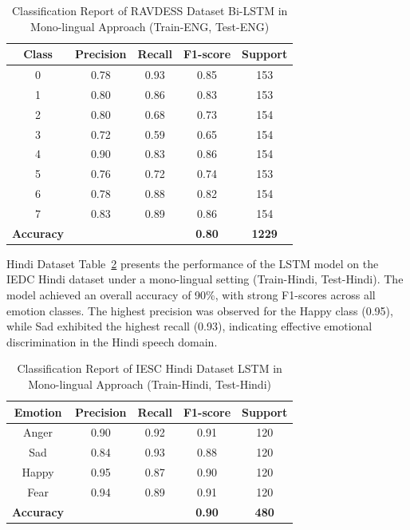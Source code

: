 \documentclass[runningheads]{llncs}
\begin{document}
\begin{table}[!htbp]
\caption{Classification Report of RAVDESS Dataset Bi-LSTM in Mono-lingual Approach (Train-ENG, Test-ENG)}
\centering
\begin{tabular}{ccccc}
\toprule
\textbf{Class} & \textbf{Precision} & \textbf{Recall} & \textbf{F1-score} & \textbf{Support} \\
\midrule
0 & 0.78 & 0.93 & 0.85 & 153 \\
1 & 0.80 & 0.86 & 0.83 & 153 \\
2 & 0.80 & 0.68 & 0.73 & 154 \\
3 & 0.72 & 0.59 & 0.65 & 154 \\
4 & 0.90 & 0.83 & 0.86 & 154 \\
5 & 0.76 & 0.72 & 0.74 & 153 \\
6 & 0.78 & 0.88 & 0.82 & 154 \\
7 & 0.83 & 0.89 & 0.86 & 154 \\
\midrule
\textbf{Accuracy} &  &  & \textbf{0.80} & \textbf{1229} \\
\bottomrule
\end{tabular}
\label{tab:ravdess_bilstm_mono_eng}
\end{table}

Hindi Dataset Table~\ref{tab:iedc_hindi_lstm_mono} presents the performance of the LSTM model on the IEDC Hindi dataset under a mono-lingual setting (Train-Hindi, Test-Hindi). The model achieved an overall accuracy of 90\%, with strong F1-scores across all emotion classes. The highest precision was observed for the Happy class (0.95), while Sad exhibited the highest recall (0.93), indicating effective emotional discrimination in the Hindi speech domain.

\begin{table}[!htbp]
\caption{Classification Report of IESC Hindi Dataset LSTM in Mono-lingual Approach (Train-Hindi, Test-Hindi)}
\centering
\begin{tabular}{ccccc}
\toprule
\textbf{Emotion} & \textbf{Precision} & \textbf{Recall} & \textbf{F1-score} & \textbf{Support} \\
\midrule
Anger & 0.90 & 0.92 & 0.91 & 120 \\
Sad & 0.84 & 0.93 & 0.88 & 120 \\
Happy & 0.95 & 0.87 & 0.90 & 120 \\
Fear & 0.94 & 0.89 & 0.91 & 120 \\
\midrule
\textbf{Accuracy} &  &  & \textbf{0.90} & \textbf{480} \\
\bottomrule
\end{tabular}
\label{tab:iedc_hindi_lstm_mono}
\end{table}
\end{document}
